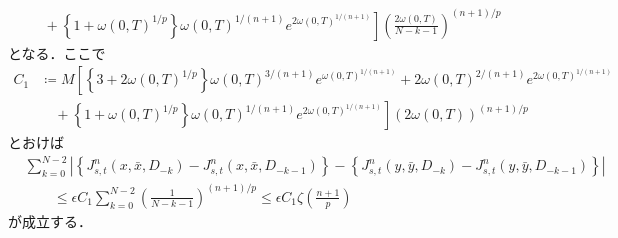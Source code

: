 \begin{prf}
\begin{description}
\begin{align}
						&\quad + \left. \left\{ 1 + \omega(0,T)^{1/p} \right\} \omega(0,T)^{1/(n+1)} e^{2 \omega(0,T)^{1/(n+1)}} \right] \left( \frac{2\omega(0,T)}{N-k-1} \right)^{(n+1)/p}
				\end{align}
				となる．ここで
				\begin{align}
					C_1 &\coloneqq M \left[ \left\{ 3 + 2 \omega(0,T)^{1/p} \right\} \omega(0,T)^{3/(n+1)} e^{\omega(0,T)^{1/(n+1)}}
						+ 2 \omega(0,T)^{2/(n+1)} e^{2 \omega(0,T)^{1/(n+1)}} \right. \\
						&\quad + \left. \left\{ 1 + \omega(0,T)^{1/p} \right\} \omega(0,T)^{1/(n+1)} e^{2 \omega(0,T)^{1/(n+1)}} \right] \left( 2\omega(0,T) \right)^{(n+1)/p}
				\end{align}
				とおけば
				\begin{align}
					&\sum_{k=0}^{N-2} \left| \left\{J^n_{s,t}(x,\bar{x},D_{-k}) - J^n_{s,t}(x,\bar{x},D_{-k-1})\right\} - \left\{J^n_{s,t}(y,\bar{y},D_{-k}) - J^n_{s,t}(y,\bar{y},D_{-k-1})\right\} \right| \\
					&\qquad \leq \epsilon C_1 \sum_{k=0}^{N-2} \left( \frac{1}{N-k-1} \right)^{(n+1)/p}
					\leq \epsilon C_1 \zeta\left( \frac{n+1}{p} \right)
				\end{align}
				が成立する．
				

\end{description}
\end{prf}
